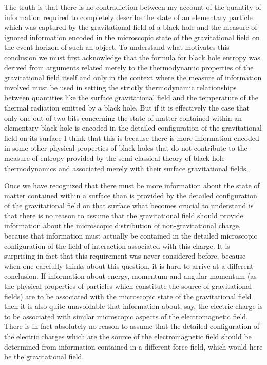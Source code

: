 \documentclass[notitlepage,12pt]{report}
\begin{document}
The truth is that there is no contradiction between my account of the quantity of information required to completely describe the state of an elementary particle which was captured by the gravitational field of a black hole and the measure of ignored information encoded in the microscopic state of the gravitational field on the event horizon of such an object. To understand what motivates this conclusion we must first acknowledge that the formula for black hole entropy was derived from arguments related merely to the thermodynamic properties of the gravitational field itself and only in the context where the measure of information involved must be used in setting the strictly thermodynamic relationships between quantities like the surface gravitational field and the temperature of the thermal radiation emitted by a black hole. But if it is effectively the case that only one out of two bits concerning the state of matter contained within an elementary black hole is encoded in the detailed configuration of the gravitational field on its surface I think that this is because there is more information encoded in some other physical properties of black holes that do not contribute to the measure of entropy provided by the semi-classical theory of black hole thermodynamics and associated merely with their surface gravitational fields.

Once we have recognized that there must be more information about the state of matter contained within a surface than is provided by the detailed configuration of the gravitational field on that surface what becomes crucial to understand is that there is no reason to assume that the gravitational field should provide information about the microscopic distribution of non-gravitational charge, because that information must actually be contained in the detailed microscopic configuration of the field of interaction associated with this charge. It is surprising in fact that this requirement was never considered before, because when one carefully thinks about this question, it is hard to arrive at a different conclusion. If information about energy, momentum and angular momentum (as the physical properties of particles which constitute the source of gravitational fields) are to be associated with the microscopic state of the gravitational field then it is also quite unavoidable that information about, say, the electric charge is to be associated with similar microscopic aspects of the electromagnetic field. There is in fact absolutely no reason to assume that the detailed configuration of the electric charges which are the source of the electromagnetic field should be determined from information contained in a different force field, which would here be the gravitational field.
\end{document}
